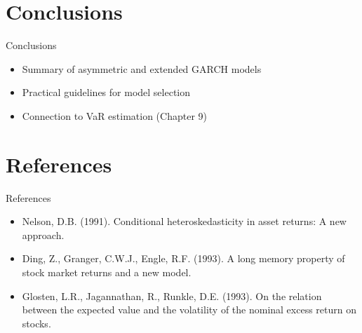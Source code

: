 \documentclass[9pt, aspectratio=169, t]{beamer}
\theoremstyle{definition}
\begin{document}
\section{Conclusions}

\begin{frame}{Conclusions}
    \begin{itemize}
        \item Summary of asymmetric and extended GARCH models
        \item Practical guidelines for model selection
        \item Connection to VaR estimation (Chapter 9)
    \end{itemize}
\end{frame}

\section{References}

\begin{frame}{References}
    \begin{itemize}
        \item Nelson, D.B. (1991). Conditional heteroskedasticity in asset returns: A new approach.
        \item Ding, Z., Granger, C.W.J., Engle, R.F. (1993). A long memory property of stock market returns and a new model.
        \item Glosten, L.R., Jagannathan, R., Runkle, D.E. (1993). On the relation between the expected value and the volatility of the nominal excess return on stocks.
    \end{itemize}
\end{frame}
\end{document}
